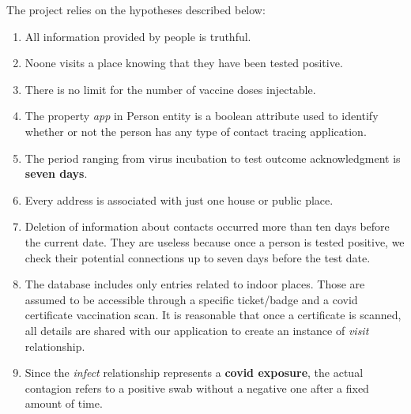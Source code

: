 \label{section 2}
The project relies on the hypotheses described below:

\begin{enumerate}
    \item All information provided by people is truthful.
    \item Noone visits a place knowing that they have been tested positive.
    \item There is no limit for the number of vaccine doses injectable.
    \item The property \textit{app} in Person entity is a boolean attribute used to identify whether or not the person has any type of contact tracing application.
    \item The period ranging from virus incubation to test outcome acknowledgment is \textbf{seven days}.
    \item Every address is associated with just one house or public place.
    \item Deletion of information about contacts occurred more than ten days before the current date. They are useless because once a person is tested positive, we check their potential connections up to seven days before the test date. 
    \item The database includes only entries related to indoor places. Those are assumed to be accessible through a specific ticket/badge and a covid certificate vaccination scan. It is reasonable that once a certificate is scanned, all details are shared with our application to create an instance of \textit{visit} relationship.
    \item Since the \textit{infect} relationship represents a \textbf{covid exposure}, the actual contagion refers to a positive swab without a negative one after a fixed amount of time. 
\end{enumerate}
